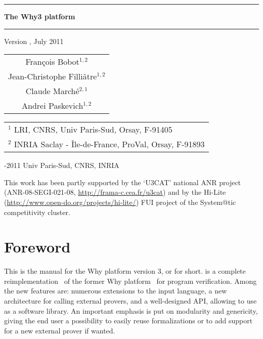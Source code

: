 \documentclass[a4paper,11pt,twoside,openright]{memoir}
\begin{document}
\sloppy
{}

\thispagestyle{empty}

\begin{center}

\rule\textwidth{0.8mm}

\vfill

{\fontsize{40}{40pt}\selectfont\bfseries\sffamily The Why3 platform}

\vfill

\rule\textwidth{0.8mm}

\vfill

\begin{LARGE}
  Version \whyversion{}, July 2011
\end{LARGE}

\vfill

\begin{Large}
  \begin{tabular}{c}
  Fran\c{c}ois Bobot$^{1,2}$ \\
  Jean-Christophe Filli\^atre$^{1,2}$  \\
  Claude March\'e$^{2,1}$ \\
  Andrei Paskevich$^{1,2}$
\end{tabular}
\end{Large}
\vfill

\begin{flushleft}

\begin{tabular}{l}
$^1$ LRI, CNRS, Univ Paris-Sud, Orsay, F-91405 \\
$^2$ INRIA Saclay - \^Ile-de-France, ProVal, Orsay, F-91893
\end{tabular}

\bigskip

  -2011 Univ Paris-Sud, CNRS, INRIA

  This work has been partly supported by the `U3CAT' national ANR project
  (ANR-08-SEGI-021-08, \url{http://frama-c.cea.fr/u3cat}) and by the
  Hi-Lite (\url{http://www.open-do.org/projects/hi-lite/}) FUI project of the
  System@tic competitivity cluster.

\end{flushleft}
\end{center}

\chapter*{Foreword}

This is the manual for the Why platform version 3, or \why for
short. \why is a complete reimplementation~\cite{boogie11why3} of the former Why
platform~\cite{filliatre07cav} for program
verification. Among the new features are: numerous
extensions to the input language, a new architecture for calling
external provers, and a well-designed API, allowing to use \why as a
software library.  An important emphasis is put on modularity and
genericity, giving the end user a possibility to easily reuse \why
formalizations or to add support for a new external prover if wanted.
\end{document}
